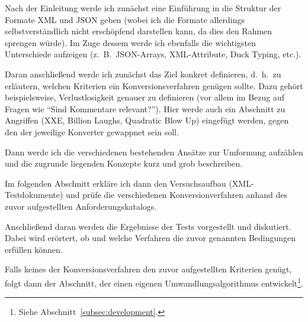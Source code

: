 \documentclass[conference]{template/IEEEtran}
\begin{document}
Nach der Einleitung werde ich zunächst eine Einführung in die Struktur der
Formate XML und JSON geben (wobei ich die Formate allerdings selbstverständlich
nicht erschöpfend darstellen kann, da dies den Rahmen sprengen würde). Im Zuge
dessem werde ich ebenfalls die wichtigsten Unterschiede aufzeigen
(z.~B.\ JSON-Arrays, XML-Attribute, Duck Typing, etc.).

Daran anschließend werde ich zunächst das Ziel konkret definieren, d.~h.\ zu
erläutern, welchen Kriterien ein Konversionsverfahren genügen sollte. Dazu
gehört beispielsweise, Verlustlosigkeit genauer zu definieren (vor allem
im Bezug auf Fragen wie \enquote{Sind Kommentare relevant?}). Hier werde auch
ein Abschnitt zu Angriffen (XXE, Billion Laughs, Quadratic Blow Up) eingefügt
werden, gegen den der jeweilige Konverter gewappnet sein soll.

Dann werde ich die verschiedenen bestehenden Ansätze zur Umformung aufzählen
und die zugrunde liegenden Konzepte kurz und grob beschreiben.

Im folgenden Abschnitt erkläre ich dann den Versuchsaufbau (XML-Testdokumente)
und prüfe die verschiedenen Konversionverfahren anhand des zuvor aufgestellten
Anforderungskatalogs.

Anschließend daran werden die Ergebnisse der Tests vorgestellt und diskutiert.
Dabei wird erörtert, ob und welche Verfahren die zuvor genannten Bedingungen
erfüllen können.

Falls keines der Konversionsverfahren den zuvor aufgestellten Kriterien genügt,
folgt dann der Abschnitt, der einen eigenen Umwandlungsalgorithmus
entwickelt\footnote{Siehe Abschnitt~\ref{subsec:development}.}.



\ifCLASSOPTIONcaptionsoff{}
  \newpage
\fi
\printbibliography{}
\end{document}
